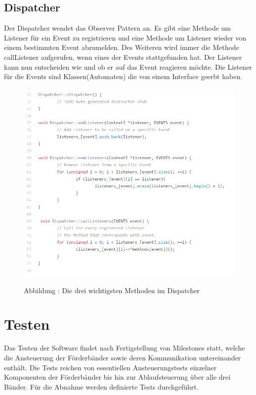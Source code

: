 \documentclass[a4paper, 11pt]{article}
\begin{document}
\newpage

\subsection{Dispatcher}
Der Dispatcher wendet das Observer Pattern an. Es gibt eine Methode um Listener für ein Event zu registrieren und eine Methode um Listener wieder von einem bestimmten Event abzumelden. Des Weiteren wird immer die Methode callListener aufgerufen, wenn eines der Events stattgefunden hat. Der Listener kann nun entscheiden wie und ob er auf das Event reagieren möchte. Die Listener für die Events sind Klassen(Automaten) die von einem Interface geerbt haben.

\begin{figure}[H]
\centering 
    \includegraphics[scale=0.7]{ISR/dispatcher.png}
    
    \small Abbildung \theimgcounter : Die drei wichtigsten Methoden im Dispatcher
    \label{dispatcher}
\end{figure}

\newpage

\section{Testen}
Das Testen der Software findet nach Fertigstellung von Milestones statt, welche die Ansteuerung der Förderbänder sowie deren Kommunikation untereinander enthält. Die Tests reichen von essentiellen Ansteuerungstests einzelner Komponenten der Förderbänder bis hin zur Ablaufsteuerung über alle drei Bänder. Für die Abnahme werden definierte Tests durchgeführt.
\end{document}
